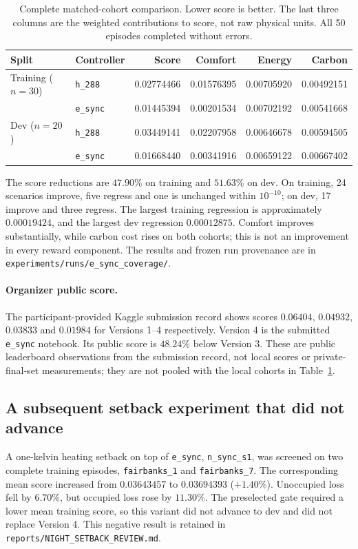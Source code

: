 \begin{table}[htbp]
\centering
\small
\begin{tabular}{llrrrr}
\toprule
Split & Controller & Score & Comfort & Energy & Carbon \\
\midrule
Training ($n=30$) & \texttt{h\_288} & 0.02774466 & 0.01576395 & 0.00705920 & 0.00492151 \\
 & \texttt{e\_sync} & 0.01445394 & 0.00201534 & 0.00702192 & 0.00541668 \\
Dev ($n=20$) & \texttt{h\_288} & 0.03449141 & 0.02207958 & 0.00646678 & 0.00594505 \\
 & \texttt{e\_sync} & 0.01668440 & 0.00341916 & 0.00659122 & 0.00667402 \\
\bottomrule
\end{tabular}
\caption{Complete matched-cohort comparison. Lower score is better. The last
three columns are the weighted contributions to score, not raw physical units.
All 50 episodes completed without errors.}
\label{tab:syncfull}
\end{table}

The score reductions are $47.90\%$ on training and $51.63\%$ on dev.
On training, 24 scenarios improve, five regress and one is unchanged within
$10^{-10}$; on dev, 17 improve and three regress. The largest training
regression is approximately $0.00019424$, and the largest dev regression
$0.00012875$. Comfort improves substantially, while carbon cost rises on
both cohorts; this is not an improvement in every reward component.
The results and frozen run provenance are in
\texttt{experiments/runs/e\_sync\_coverage/}.

\paragraph{Organizer public score.}
The participant-provided Kaggle submission record shows scores
$0.06404$, $0.04932$, $0.03833$ and $0.01984$ for Versions 1--4 respectively.
Version 4 is the submitted \texttt{e\_sync} notebook. Its public score is
$48.24\%$ below Version 3. These are public leaderboard observations from
the submission record, not local scores or private-final-set measurements;
they are not pooled with the local cohorts in Table~\ref{tab:syncfull}.

\subsection{A subsequent setback experiment that did not advance}
A one-kelvin heating setback on top of \texttt{e\_sync},
\texttt{n\_sync\_s1}, was screened on two complete training episodes,
\texttt{fairbanks\_1} and \texttt{fairbanks\_7}. The corresponding mean score
increased from $0.03643457$ to $0.03694393$ ($+1.40\%$).
Unoccupied loss fell by $6.70\%$, but occupied loss rose by $11.30\%$.
The preselected gate required a lower mean training score, so this variant
did not advance to dev and did not replace Version 4. This negative result
is retained in \texttt{reports/NIGHT\_SETBACK\_REVIEW.md}.

